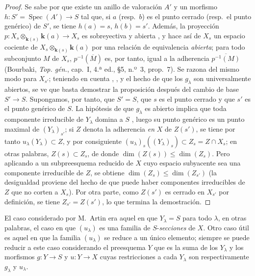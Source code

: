 \begin{proof}
Se sabe por  que existe un anillo de valoración $A'$ y un morfismo $h:S'=\operatorname{Spec}(A')\to S$ tal que, si $a$ (resp.\ $b$) es el punto cerrado (resp.\ el punto genérico) de $S'$, se tiene $h(a)=s$, $h(b)=s'$.
Además, la proyección $p:X_s\otimes_{\mathbf{k}(s)}\boldsymbol{k}(a)\to X_s$ es sobreyectiva y abierta , y hace así de $X_s$ un espacio cociente de $X_s\otimes_{\mathbf{k}(s)}\boldsymbol{k}(a)$ por una relación de equivalencia \emph{abierta}; para todo subconjunto $M$ de $X_s$, $p^{-1}(\overline M)$ es, por tanto, igual a la adherencia $\overline{p^{-1}(M)}$ (Bourbaki, \emph{Top. gén.}, cap.~I, 4.ª ed., \S5, n.º~3, prop.~7).
Se razona del mismo modo para $X_{s'}$; teniendo en cuenta , , y el hecho de que los $g_\lambda$ son universalmente abiertos, se ve que basta demostrar la proposición después del cambio de base $S'\to S$.
Supongamos, por tanto, que $S'=S$, que $s$ es el punto cerrado y que $s'$ es el punto genérico de $S$.
La hipótesis de que $g_\lambda$ es abierto implica que toda componente irreducible de $Y_\lambda$ domina a $S$ , luego su punto genérico es un punto maximal de $(Y_\lambda)_{s'}$; si $Z$ denota la adherencia \emph{en} $X$ de $Z(s')$, se tiene por tanto $u_\lambda(Y_\lambda)\subset Z$, y por consiguiente $(u_\lambda)_s((Y_\lambda)_s)\subset Z_s=Z\cap X_s$; en otras palabras, $Z(s)\subset Z_s$, de donde $\dim(Z(s))\leq\dim(Z_s)$.
Pero aplicando  a un subpreesquema reducido de $X$ cuyo espacio subyacente sea una componente irreducible de $Z$, se obtiene $\dim(Z_s)\leq\dim(Z_{s'})$ (la desigualdad proviene del hecho de que puede haber componentes irreducibles de $Z$ que no corten a $X_s$).
Por otra parte, como $Z(s')$ es cerrado en $X_{s'}$ por definición, se tiene $Z_{s'}=Z(s')$, lo que termina la demostración.
\end{proof}

\begin{remark}[14.3.12]
\label{IV.14.3.12}
El caso considerado por M.\ Artin era aquel en que $Y_\lambda=S$ para todo $\lambda$, en otras palabras, el caso en que $(u_\lambda)$ es una familia de $S$-\emph{secciones} de $X$.
Otro caso útil es aquel en que la familia $(u_\lambda)$ se reduce a un único elemento; siempre se puede reducir a este caso considerando el preesquema $Y$ que es la suma de los $Y_\lambda$ y los morfismos $g:Y\to S$ y $u:Y\to X$ cuyas restricciones a cada $Y_\lambda$ son respectivamente $g_\lambda$ y $u_\lambda$.
\end{remark}


